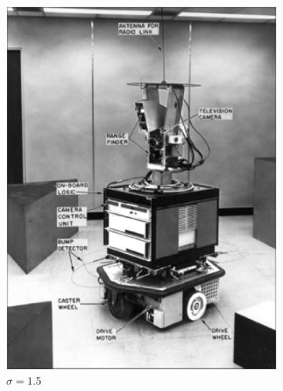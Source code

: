 \documentclass[lettersize,journal]{IEEEtran}
\begin{document}
\begin{figure}[h]
\begin{subfigure}[h]{0.115\textwidth}
        \includegraphics[width=\linewidth]{gaussian_map_5x5_sigma_1.5}
        \caption{$\sigma=1.5$}  
    \end{subfigure}
    \begin{subfigure}[h]{0.115\textwidth}
        \centering

\end{subfigure}
\end{figure}
\end{document}
